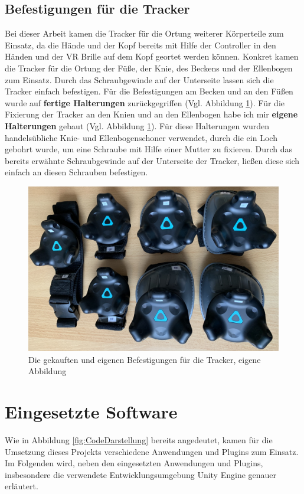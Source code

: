 \subsection{Befestigungen für die Tracker}\label{sec:TrackerBefestigung}
Bei dieser Arbeit kamen die Tracker für die Ortung weiterer Körperteile zum Einsatz, da die Hände und der Kopf bereits mit Hilfe der Controller in den Händen und der VR Brille auf dem Kopf geortet werden können. Konkret kamen die Tracker für die Ortung der Füße, der Knie, des Beckens und der Ellenbogen zum Einsatz. Durch das Schraubgewinde auf der Unterseite lassen sich die Tracker einfach befestigen. Für die Befestigungen am Becken und an den Füßen wurde auf \textbf{fertige Halterungen} zurückgegriffen (Vgl. Abbildung \ref{fig:Mounts}). Für die Fixierung der Tracker an den Knien und an den Ellenbogen habe ich mir \textbf{eigene Halterungen} gebaut (Vgl. Abbildung \ref{fig:Mounts}). Für diese Halterungen wurden handelsübliche Knie- und Ellenbogenschoner verwendet, durch die ein Loch gebohrt wurde, um eine Schraube mit Hilfe einer Mutter zu fixieren. Durch das bereits erwähnte Schraubgewinde auf der Unterseite der Tracker, ließen diese sich einfach an diesen Schrauben befestigen.
\begin{figure}[h]
	\centering
	\includegraphics[width=0.6\linewidth]{Bilder/A32_Mounts}
	\caption{Die gekauften und eigenen Befestigungen für die Tracker, eigene Abbildung}
	\label{fig:Mounts}
\end{figure}
\newpage
\section{Eingesetzte Software}\label{sec:Software}
Wie in Abbildung \ref{fig:CodeDarstellung} bereits angedeutet, kamen für die Umsetzung dieses Projekts verschiedene Anwendungen und Plugins zum Einsatz. Im Folgenden wird, neben den eingesetzten Anwendungen und Plugins, insbesondere die verwendete Entwicklungsumgebung Unity Engine genauer erläutert.

